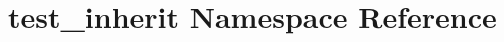 \hypertarget{namespacetest__inherit}{\section{test\-\_\-inherit Namespace Reference}
\label{namespacetest__inherit}
}
